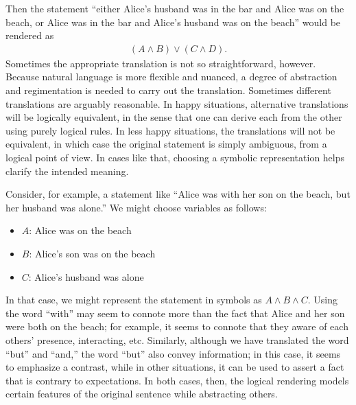 \documentclass[letterpaper,10pt,english]{sphinxmanual}
\begin{document}
\sphinxAtStartPar
Then the statement “either Alice’s husband was in the bar and Alice was on the beach, or Alice was in the bar and Alice’s husband was on the beach” would be rendered as
\begin{equation*}
\begin{split}(A \wedge B) \vee (C \wedge D).\end{split}
\end{equation*}
\sphinxAtStartPar
Sometimes the appropriate translation is not so straightforward, however. Because natural language is more flexible and nuanced, a degree of abstraction and regimentation is needed to carry out the translation. Sometimes different translations are arguably reasonable. In happy situations, alternative translations will be logically equivalent, in the sense that one can derive each from the other using purely logical rules. In less happy situations, the translations will not be equivalent, in which case the original statement is simply ambiguous, from a logical point of view. In cases like that, choosing a symbolic representation helps clarify the intended meaning.

\sphinxAtStartPar
Consider, for example, a statement like “Alice was with her son on the beach, but her husband was alone.” We might choose variables as follows:
\begin{itemize}
\item {} 
\sphinxAtStartPar
\(A\): Alice was on the beach

\item {} 
\sphinxAtStartPar
\(B\): Alice’s son was on the beach

\item {} 
\sphinxAtStartPar
\(C\): Alice’s husband was alone

\end{itemize}

\sphinxAtStartPar
In that case, we might represent the statement in symbols as \(A \wedge B \wedge C\). Using the word “with” may seem to connote more than the fact that Alice and her son were both on the beach; for example, it seems to connote that they aware of each others’ presence, interacting, etc. Similarly, although we have translated the word “but” and “and,” the word “but” also convey information; in this case, it seems to emphasize a contrast, while in other situations, it can be used to assert a fact that is contrary to expectations. In both cases, then, the logical rendering models certain features of the original sentence while abstracting others.
\end{document}
